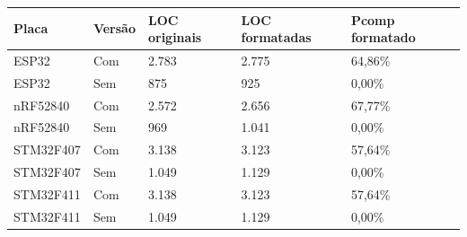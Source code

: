 \begin{tabular}{lllll}
\hline
Placa & Versão & LOC originais & LOC formatadas & Pcomp formatado \\
\hline
ESP32 & Com & 2.783 & 2.775 & 64,86\% \\
ESP32 & Sem & 875 & 925 & 0,00\% \\
nRF52840 & Com & 2.572 & 2.656 & 67,77\% \\
nRF52840 & Sem & 969 & 1.041 & 0,00\% \\
STM32F407 & Com & 3.138 & 3.123 & 57,64\% \\
STM32F407 & Sem & 1.049 & 1.129 & 0,00\% \\
STM32F411 & Com & 3.138 & 3.123 & 57,64\% \\
STM32F411 & Sem & 1.049 & 1.129 & 0,00\% \\
\hline
\end{tabular}
